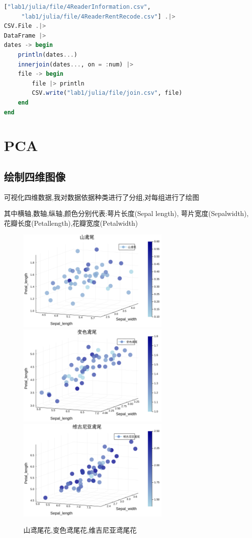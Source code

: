 \documentclass[a4paper]{article}
\begin{document}
\begin{lstlisting}[language=julia]
["lab1/julia/file/4ReaderInformation.csv",
     "lab1/julia/file/4ReaderRentRecode.csv"] .|>
CSV.File .|>
DataFrame |>
dates -> begin
    println(dates...)
    innerjoin(dates..., on = :num) |>
    file -> begin
        file |> println
        CSV.write("lab1/julia/file/join.csv", file)
    end
end
\end{lstlisting}

\newpage

\section{PCA}\label{sub:PCA}
\subsection{绘制四维图像} \label{sub:plot}
可视化四维数据,我对数据依据种类进行了分组,对每组进行了绘图

其中横轴,数轴,纵轴,颜色分别代表:萼片长度(Sepal length), 萼片宽度(Sepalwidth),花瓣长度(Petallength),花瓣宽度(Petalwidth)

\begin{figure}[ht]
    \centering
    \includegraphics[height=5cm]{山鸢尾花.png}
    \includegraphics[height=5cm]{变色鸢尾花.png}
    \includegraphics[height=5cm]{维吉尼亚鸢尾花.png}
    \caption{山鸢尾花,变色鸢尾花,维吉尼亚鸢尾花}
\end{figure}
\end{document}
